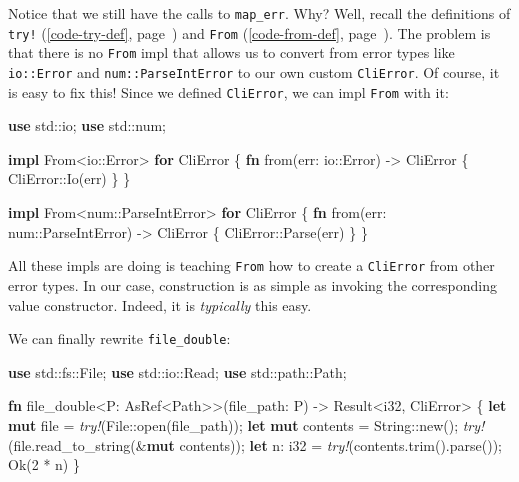 \documentclass[a4paper,]{book}
\renewcommand*{\hyperlink}[2]{%
 #2 (\autoref{#1}, page~\pageref{#1})}
\newenvironment{Shaded}{\begin{snugshade}}{\end{snugshade}}
\newcommand{\KeywordTok}[1]{\textcolor[rgb]{0.13,0.29,0.53}{\textbf{{#1}}}}
\newcommand{\DataTypeTok}[1]{\textcolor[rgb]{0.13,0.29,0.53}{{#1}}}
\newcommand{\DecValTok}[1]{\textcolor[rgb]{0.00,0.00,0.81}{{#1}}}
\newcommand{\ConstantTok}[1]{\textcolor[rgb]{0.00,0.00,0.00}{{#1}}}
\newcommand{\PreprocessorTok}[1]{\textcolor[rgb]{0.56,0.35,0.01}{\textit{{#1}}}}
\newcommand{\NormalTok}[1]{{#1}}
\begin{document}
Notice that we still have the calls to \texttt{map\_err}. Why? Well,
recall the definitions of
\protect\hyperlink{code-try-def}{\texttt{try!}} and
\protect\hyperlink{code-from-def}{\texttt{From}}. The problem is that
there is no \texttt{From} impl that allows us to convert from error
types like \texttt{io::Error} and \texttt{num::ParseIntError} to our own
custom \texttt{CliError}. Of course, it is easy to fix this! Since we
defined \texttt{CliError}, we can impl \texttt{From} with it:

\begin{Shaded}
\begin{Highlighting}[]
\KeywordTok{use} \NormalTok{std::io;}
\KeywordTok{use} \NormalTok{std::num;}

\KeywordTok{impl} \NormalTok{From<io::Error> }\KeywordTok{for} \NormalTok{CliError \{}
    \KeywordTok{fn} \NormalTok{from(err: io::Error) -> CliError \{}
        \NormalTok{CliError::Io(err)}
    \NormalTok{\}}
\NormalTok{\}}

\KeywordTok{impl} \NormalTok{From<num::ParseIntError> }\KeywordTok{for} \NormalTok{CliError \{}
    \KeywordTok{fn} \NormalTok{from(err: num::ParseIntError) -> CliError \{}
        \NormalTok{CliError::Parse(err)}
    \NormalTok{\}}
\NormalTok{\}}
\end{Highlighting}
\end{Shaded}

All these impls are doing is teaching \texttt{From} how to create a
\texttt{CliError} from other error types. In our case, construction is
as simple as invoking the corresponding value constructor. Indeed, it is
\emph{typically} this easy.

We can finally rewrite \texttt{file\_double}:

\begin{Shaded}
\begin{Highlighting}[]

\KeywordTok{use} \NormalTok{std::fs::File;}
\KeywordTok{use} \NormalTok{std::io::Read;}
\KeywordTok{use} \NormalTok{std::path::Path;}

\KeywordTok{fn} \NormalTok{file_double<P: AsRef<Path>>(file_path: P) -> }\DataTypeTok{Result}\NormalTok{<}\DataTypeTok{i32}\NormalTok{, CliError> \{}
    \KeywordTok{let} \KeywordTok{mut} \NormalTok{file = }\PreprocessorTok{try!}\NormalTok{(File::open(file_path));}
    \KeywordTok{let} \KeywordTok{mut} \NormalTok{contents = }\DataTypeTok{String}\NormalTok{::new();}
    \PreprocessorTok{try!}\NormalTok{(file.read_to_string(&}\KeywordTok{mut} \NormalTok{contents));}
    \KeywordTok{let} \NormalTok{n: }\DataTypeTok{i32} \NormalTok{= }\PreprocessorTok{try!}\NormalTok{(contents.trim().parse());}
    \ConstantTok{Ok}\NormalTok{(}\DecValTok{2} \NormalTok{* n)}
\NormalTok{\}}
\end{Highlighting}
\end{Shaded}
\end{document}
